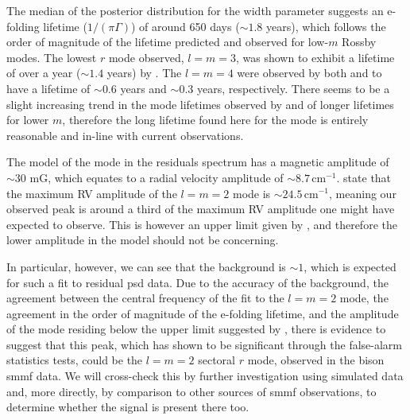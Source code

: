 The median of the posterior distribution for the width parameter suggests an e-folding lifetime ($1/(\pi \Gamma)$) of around 650 days ($\sim 1.8$ years), which follows the order of magnitude of the lifetime predicted and observed for low-$m$ Rossby modes. The lowest $r$ mode observed, $l=m=3$, was shown to exhibit a lifetime of over a year ($\sim 1.4$ years) by \citet{liang_time-distance_2019}. The $l=m=4$ were observed by both \citet{loptien_global-scale_2018} and \citet{liang_time-distance_2019} to have a lifetime of $\sim 0.6$ years and $\sim 0.3$ years, respectively. There seems to be a slight increasing trend in the mode lifetimes observed by \citet{loptien_global-scale_2018} and \citet{liang_time-distance_2019} of longer lifetimes for lower $m$, therefore the long lifetime found here for the mode is entirely reasonable and in-line with current observations.

The model of the mode in the residuals spectrum has a magnetic amplitude of $\sim 30$ mG, which equates to a radial velocity amplitude of $\sim 8.7 \, \mathrm{cm}^{-1}$. \citet{lanza_sectoral_2019} state that the maximum RV amplitude of the $l=m=2$ mode is $\sim 24.5 \,\mathrm{cm}^{-1}$, meaning our observed peak is around a third of the maximum RV amplitude one might have expected to observe. This is however an upper limit given by \citet{lanza_sectoral_2019}, and therefore the lower amplitude in the model should not be concerning.

In particular, however, we can see that the background is $\sim 1$, which is expected for such a fit to residual \gls{psd} data. Due to the accuracy of the background, the agreement between the central frequency of the fit to the $l=m=2$ mode, the agreement in the order of magnitude of the e-folding lifetime, and the amplitude of the mode residing below the upper limit suggested by \citet{lanza_sectoral_2019}, there is evidence to suggest that this peak, which has shown to be significant through the false-alarm statistics tests, could be the $l=m=2$ sectoral $r$ mode, observed in the \gls{bison} \gls{smmf} data. We will cross-check this by further investigation using simulated data and, more directly, by comparison to other sources of \gls{smmf} observations, to determine whether the signal is present there too.







